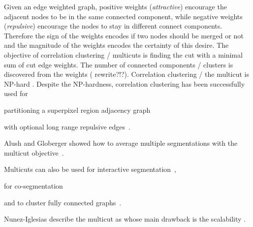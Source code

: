\documentclass[10pt,twocolumn,letterpaper]{article}
\begin{document}
Given an edge weighted graph, positive weights (\emph{attractive})
encourage the adjacent nodes to be in the same 
connected component, while negative weights (\emph{repulsive}) encourage
the nodes to stay in different connect components.
Therefore the sign of the weights encodes if two
nodes should be merged or not and the magnitude of the weights encodes
the certainty of this desire.
The objective of correlation clustering / multicuts
is finding the cut with a minimal sum of cut edge weights.
The number of connected components / clusters is discovered
from the weights ( rewrite?!?).
Correlation clustering / the multicut is NP-hard \cite{???}.
%
Despite the NP-hardness, correlation clustering has been 
successfully used for
\begin{inparaenum}[(i)]
    \item partitioning a superpixel region adjacency graph~\cite{andres_2011_iccv,kroeger_2012_eccv}
    \item with optional long range repulsive edges~\cite{andres_2013_emmcvpr}.
    \item Alush and Globerger showed how to average multiple segmentations with the multicut objective~\cite{alush_2012_pami}.
    \item Multicuts can also be used for interactive segmentation~\cite{bagon_2011_arxiv},
    \item for co-segmentation~\cite{glassner_2011_cvpr}
    \item and to cluster fully connected graphs~\cite{???}.
\end{inparaenum}







Nunez-Iglesias \etal describe the multicut as
 whose 
main drawback is the scalability \cite{nunez_iglesias_2013}.

\end{document}
